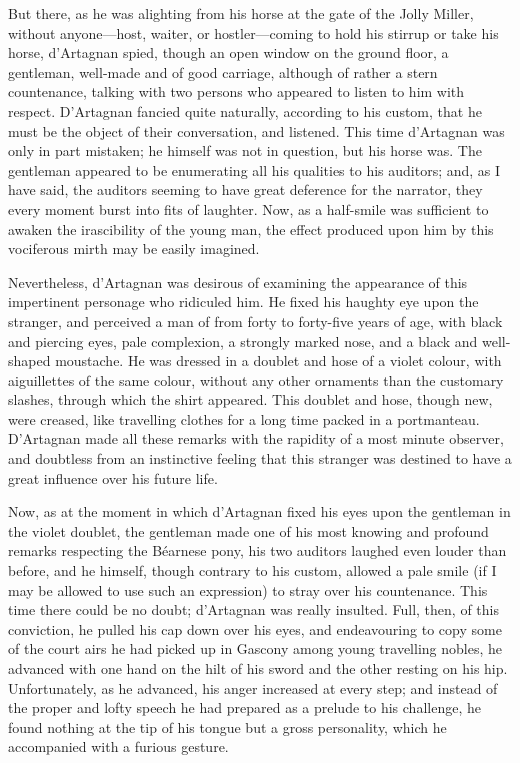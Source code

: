 But there, as he was alighting from his horse at the gate of the Jolly Miller, without anyone---host, waiter, or hostler---coming to hold his stirrup or take his horse, d'Artagnan spied, though an open window on the ground floor, a gentleman, well-made and of good carriage, although of rather a stern countenance, talking with two persons who appeared to listen to him with respect. D'Artagnan fancied quite naturally, according to his custom, that he must be the object of their conversation, and listened. This time d'Artagnan was only in part mistaken; he himself was not in question, but his horse was. The gentleman appeared to be enumerating all his qualities to his auditors; and, as I have said, the auditors seeming to have great deference for the narrator, they every moment burst into fits of laughter. Now, as a half-smile was sufficient to awaken the irascibility of the young man, the effect produced upon him by this vociferous mirth may be easily imagined. 

Nevertheless, d'Artagnan was desirous of examining the appearance of this impertinent personage who ridiculed him. He fixed his haughty eye upon the stranger, and perceived a man of from forty to forty-five years of age, with black and piercing eyes, pale complexion, a strongly marked nose, and a black and well-shaped moustache. He was dressed in a doublet and hose of a violet colour, with aiguillettes of the same colour, without any other ornaments than the customary slashes, through which the shirt appeared. This doublet and hose, though new, were creased, like travelling clothes for a long time packed in a portmanteau. D'Artagnan made all these remarks with the rapidity of a most minute observer, and doubtless from an instinctive feeling that this stranger was destined to have a great influence over his future life. 

Now, as at the moment in which d'Artagnan fixed his eyes upon the gentleman in the violet doublet, the gentleman made one of his most knowing and profound remarks respecting the Béarnese pony, his two auditors laughed even louder than before, and he himself, though contrary to his custom, allowed a pale smile (if I may be allowed to use such an expression) to stray over his countenance. This time there could be no doubt; d'Artagnan was really insulted. Full, then, of this conviction, he pulled his cap down over his eyes, and endeavouring to copy some of the court airs he had picked up in Gascony among young travelling nobles, he advanced with one hand on the hilt of his sword and the other resting on his hip. Unfortunately, as he advanced, his anger increased at every step; and instead of the proper and lofty speech he had prepared as a prelude to his challenge, he found nothing at the tip of his tongue but a gross personality, which he accompanied with a furious gesture. 

